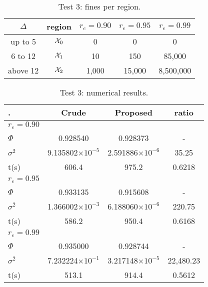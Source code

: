 \documentclass[a4paper]{article}
\begin{document}
\begin{table}
\begin{center} \small
\begin{tabular}{ | c | c | c | c | c | }
\hline
$\Delta$ & region & $r_e=0.90$ & $r_e=0.95$ & $r_e=0.99$ \\ \hline \hline
up to 5	  & ${\cal X}_0$  & 0 & 0 & 0 \\ \hline
6 to 12	   & ${\cal X}_1$ & 10 & 150 & 85,000 \\ \hline
above 12 & ${\cal X}_2$ & 1,000 & 15,000 & 8,500,000 \\ \hline
\end{tabular}
\end{center}
\caption{Test 3: fines per region.}
\label{tab:fines-3}
\end{table}


\begin{table}
\begin{center} \small
\begin{tabular}{ | l | c | c | c | }
\hline
. & Crude &  Proposed &  ratio \\ \hline \hline
$r_e=0.90$ \\ \hline \hline
\quad $\Phi$ &  0.928540  &  0.928373  &  - \\ \hline
\quad $\sigma^2$ & 9.135802$\times 10^{-5}$ & 2.591886$\times 10^{-6}$ & 35.25 \\ \hline
\quad t(s) & 606.4 &  975.2  & 0.6218 \\ \hline
$r_e=0.95$ \\ \hline \hline
\quad $\Phi$ &  0.933135  &  0.915608  &  - \\ \hline
\quad $\sigma^2$ & 1.366002$\times 10^{-3}$ & 6.188060$\times 10^{-6}$ & 220.75 \\ \hline
\quad t(s) & 586.2 &  950.4  & 0.6168 \\ \hline
$r_e=0.99$ \\ \hline \hline
\quad $\Phi$ &  0.935000  &  0.928744  &  - \\ \hline
\quad $\sigma^2$ & 7.232224$\times 10^{-1}$ & 3.217148$\times 10^{-5}$ & 22,480.23 \\ \hline
\quad t(s) & 513.1 &  914.4  & 0.5612 \\ \hline
\end{tabular}
\end{center}
\caption{Test 3: numerical results.}
\label{tab:results-case-3}
\end{table}
\end{document}
